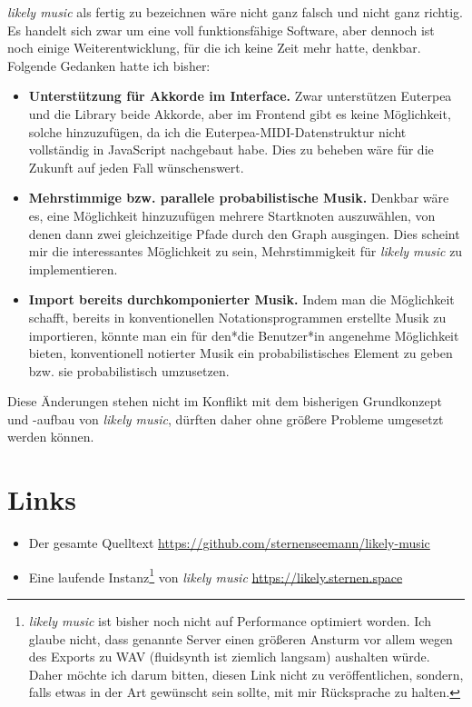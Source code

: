\documentclass[a4paper,twocolumn]{article}
\begin{document}
{\it likely music} als fertig zu bezeichnen wäre nicht ganz falsch und nicht
ganz richtig. Es handelt sich zwar um eine voll funktionsfähige Software, aber
dennoch ist noch einige Weiterentwicklung, für die ich keine Zeit mehr hatte,
denkbar. Folgende Gedanken hatte ich
bisher:

\begin{itemize}
  \item {\bf Unterstützung für Akkorde im Interface.} Zwar unterstützen Euterpea
    und die Library beide Akkorde, aber im Frontend gibt es keine Möglichkeit,
    solche hinzuzufügen, da ich die Euterpea-MIDI-Datenstruktur nicht
    vollständig in JavaScript nachgebaut habe. Dies zu beheben wäre für die
    Zukunft auf jeden Fall wünschenswert.
  \item {\bf Mehrstimmige bzw. parallele probabilistische Musik.} Denkbar wäre
    es, eine Möglichkeit hinzuzufügen mehrere Startknoten auszuwählen, von denen
    dann zwei gleichzeitige Pfade durch den Graph ausgingen. Dies scheint mir
    die interessantes Möglichkeit zu sein, Mehrstimmigkeit für {\it likely music}
    zu implementieren.
  \item {\bf Import bereits durchkomponierter Musik.} Indem man die Möglichkeit
    schafft, bereits in
    konventionellen Notationsprogrammen erstellte Musik zu importieren, könnte man
    ein für den*die Benutzer*in angenehme Möglichkeit bieten, konventionell
    notierter Musik ein probabilistisches Element zu geben bzw. sie
    probabilistisch umzusetzen.
\end{itemize}

Diese Änderungen stehen nicht im Konflikt mit dem bisherigen Grundkonzept und -aufbau von
{\it likely music}, dürften daher ohne größere Probleme umgesetzt werden können.

\section*{Links}

\begin{itemize}
\item Der gesamte Quelltext \url{https://github.com/sternenseemann/likely-music}
\item Eine laufende Instanz\footnote{{\it likely music} ist bisher noch nicht
  auf Performance optimiert worden. Ich glaube nicht, dass genannte Server einen
    größeren Ansturm vor allem wegen des Exports zu WAV (fluidsynth
    \cite{fluidsynth} ist ziemlich
    langsam) aushalten würde. Daher möchte ich darum bitten, diesen Link nicht
    zu veröffentlichen, sondern, falls etwas in der Art gewünscht sein sollte,
    mit mir Rücksprache zu halten.} von {\it likely music} \url{https://likely.sternen.space}
\end{itemize}
\end{document}

